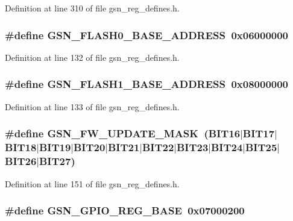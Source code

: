 Definition at line 310 of file gsn\_\-reg\_\-defines.h.

\hypertarget{a00546_ac1960d07567f36bd8684c878bdcbb907}{
\subsubsection[{GSN\_\-FLASH0\_\-BASE\_\-ADDRESS}]{\setlength{\rightskip}{0pt plus 5cm}\#define GSN\_\-FLASH0\_\-BASE\_\-ADDRESS~0x06000000}}
\label{a00546_ac1960d07567f36bd8684c878bdcbb907}


Definition at line 132 of file gsn\_\-reg\_\-defines.h.

\hypertarget{a00546_a37abc3905a828f28c8c3ca1e103b8d5d}{
\subsubsection[{GSN\_\-FLASH1\_\-BASE\_\-ADDRESS}]{\setlength{\rightskip}{0pt plus 5cm}\#define GSN\_\-FLASH1\_\-BASE\_\-ADDRESS~0x08000000}}
\label{a00546_a37abc3905a828f28c8c3ca1e103b8d5d}


Definition at line 133 of file gsn\_\-reg\_\-defines.h.

\hypertarget{a00546_a4e92a5bdf7d24bec90b6697cb205753c}{
\subsubsection[{GSN\_\-FW\_\-UPDATE\_\-MASK}]{\setlength{\rightskip}{0pt plus 5cm}\#define GSN\_\-FW\_\-UPDATE\_\-MASK~(BIT16$|$BIT17$|$BIT18$|$BIT19$|$BIT20$|$BIT21$|$BIT22$|$BIT23$|$BIT24$|$BIT25$|$BIT26$|$BIT27)}}
\label{a00546_a4e92a5bdf7d24bec90b6697cb205753c}


Definition at line 151 of file gsn\_\-reg\_\-defines.h.

\hypertarget{a00546_aa0d6278b3da0def98aa3fe50f8b5d436}{
\subsubsection[{GSN\_\-GPIO\_\-REG\_\-BASE}]{\setlength{\rightskip}{0pt plus 5cm}\#define GSN\_\-GPIO\_\-REG\_\-BASE~0x07000200}}
\label{a00546_aa0d6278b3da0def98aa3fe50f8b5d436}


